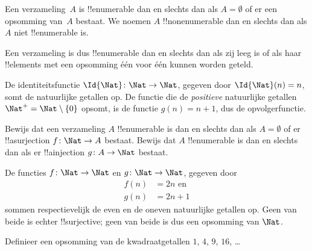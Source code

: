 \documentclass[../../../include/open-logic-section]{subfiles}
\begin{document}
\begin{defn}
  Een verzameling~$A$ is !!{enumerable} dan en slechts dan als $A =
  \emptyset$ of er een opsomming van~$A$ bestaat. We noemen $A$
  !!{nonenumerable} dan en slechts dan als $A$ niet !!{enumerable} is.
\end{defn}

\begin{explain}
Een verzameling is dus !!{enumerable} dan en slechts dan als zij leeg
is of als haar !!{element}s met een opsomming één voor één kunnen
worden geteld.
\end{explain}

\begin{ex}
De identiteitsfunctie $\Id{\Nat} \colon \Nat \to \Nat$, gegeven door
$\Id{\Nat}(n) = n$, somt de natuurlijke getallen op. De functie die de
\emph{positieve} natuurlijke getallen $\Nat^+ = \Nat \setminus
\{0\}$ opsomt, is de functie $g(n) = n + 1$, dus de opvolgerfunctie.
\end{ex}

\begin{prob}
Bewijs dat een verzameling $A$ !!{enumerable} is dan en slechts dan
als $A = \emptyset$ of er !!a{surjection} $f\colon \Nat \to A$
bestaat. Bewijs dat $A$ !!{enumerable} is dan en slechts dan als er
!!a{injection} $g\colon A \to \Nat$ bestaat.
\end{prob}

\begin{ex}
De functies $f\colon \Nat \to \Nat$ en $g \colon \Nat \to \Nat$,
gegeven door
\begin{align*}
  f(n) & = 2n \text{ en}\\
  g(n) & = 2n+1
\end{align*}
sommen respectievelijk de even en de oneven natuurlijke getallen op.
Geen van beide is echter !!{surjective}; geen van beide is dus een
opsomming van $\Nat$.
\end{ex}

\begin{prob}
Definieer een opsomming van de kwadraatgetallen $1$, $4$, $9$, $16$,
\dots
\end{prob}
\end{document}

